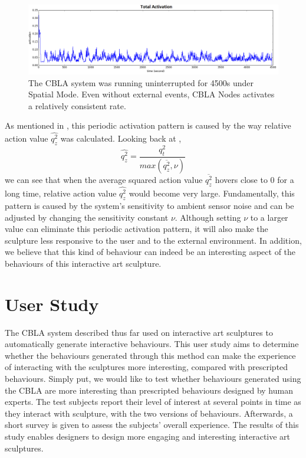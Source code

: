 \begin{figure} [!htbp]
	\centering
	\includegraphics[width=1.0\textwidth]{"fig/validations/multi-cluster experiment cyclic activation"}
	\caption[Periodic spontaneous activation over a period of 4500s]{The CBLA system was running uninterrupted for 4500s under Spatial Mode. Even without external events, CBLA Nodes activates a relatively consistent rate.}
	\label{fig:multi-cluster experiment cyclic activation}
\end{figure}

As mentioned in , this periodic activation pattern is caused by the way relative action value $\widehat{q^2_z}$ was calculated. Looking back at 
, \[\widehat{q^2_z} = \frac{q_t^2}{max(\overline{q^2_z}, \nu)}\] we can see that when the average squared action value $\overline{q^2_z}$ hovers close to 0 for a long time, relative action value $\widehat{q^2_z}$ would become very large. Fundamentally, this pattern is caused by the system's sensitivity to ambient sensor noise and can be adjusted by changing the sensitivity constant $\nu$. Although setting $\nu$ to a larger value can eliminate this periodic activation pattern, it will also make the sculpture less responsive to the user and to the external environment. In addition, we believe that this kind of behaviour can indeed be an interesting aspect of the behaviours of this interactive art sculpture. 


\section{User Study}\label{sec:user-study}

The CBLA system described thus far used on interactive art sculptures to automatically generate interactive behaviours. This user study aims to determine whether the behaviours generated through this method can make the experience of interacting with the sculptures more interesting, compared with prescripted behaviours. Simply put, we would like to test whether behaviours generated using the CBLA are more interesting than prescripted behaviours designed by human experts. The test subjects report their level of interest at several points in time as they interact with sculpture, with the two versions of behaviours. Afterwards, a short survey is given to assess the subjects' overall experience. The results of this study enables designers to design more engaging and interesting interactive art sculptures. 

